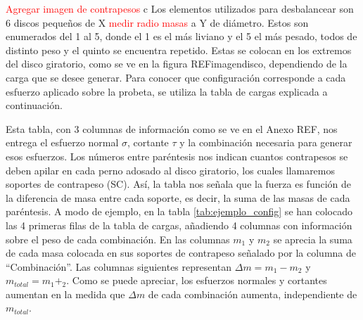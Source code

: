 \textcolor{red}{Agregar imagen de contrapesos}
 c
Los elementos utilizados para desbalancear son 6 discos pequeños de X \textcolor{red}{medir radio masas} a Y de diámetro. Estos son enumerados del 1 al 5, donde el 1 es el más liviano y el 5 el más pesado, todos de distinto peso y el quinto se encuentra repetido. Estas se colocan en los extremos del disco giratorio, como se ve en la figura REFimagendisco, dependiendo de la carga que se desee generar. Para conocer que configuración corresponde a cada esfuerzo aplicado sobre la probeta, se utiliza la tabla de cargas explicada a continuación.


Esta tabla, con 3 columnas de información como se ve en el Anexo REF, nos entrega el esfuerzo normal $\sigma$, cortante $\tau$ y la combinación necesaria para generar esos esfuerzos. Los números entre paréntesis nos indican cuantos contrapesos se deben apilar en cada perno adosado al disco giratorio, los cuales llamaremos soportes de contrapeso (SC). Así, la tabla nos señala que la fuerza es función de la diferencia de masa entre cada soporte, es decir, la suma de las masas de cada paréntesis. A modo de ejemplo, en la tabla \ref{tab:ejemplo_config} se han colocado las 4 primeras filas de la tabla de cargas, añadiendo 4 columnas con información sobre el peso de cada combinación. En las columnas $m_1$ y $m_2$ se aprecia la suma de cada masa colocada en sus soportes de contrapeso señalado por la columna de ``Combinación''. Las columnas siguientes representan $\Delta m = m_1-m_2$ y $m_{total}=m_1+_2$. Como se puede apreciar, los esfuerzos normales y cortantes aumentan en la medida que $\Delta m$ de cada combinación aumenta, independiente de $m_{total}$.

